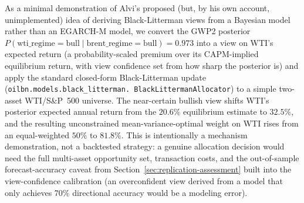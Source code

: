 As a minimal demonstration of Alvi's proposed (but, by his own account,
unimplemented) idea of deriving Black-Litterman views from a Bayesian
model rather than an EGARCH-M model, we convert the GWP2 posterior
$P(\text{wti\_regime}=\text{bull} \mid \text{brent\_regime}=\text{bull})
= 0.973$ into a view on WTI's expected return (a probability-scaled
premium over its CAPM-implied equilibrium return, with view confidence
set from how sharp the posterior is) and apply the standard
closed-form Black-Litterman update (\texttt{oilbn.models.black\_litterman.
BlackLittermanAllocator}) to a simple two-asset WTI/S\&P~500 universe.
The near-certain bullish view shifts WTI's posterior expected annual
return from the $20.6\%$ equilibrium estimate to $32.5\%$, and the
resulting unconstrained mean-variance-optimal weight on WTI rises from
an equal-weighted $50\%$ to $81.8\%$. This is intentionally a
mechanism demonstration, not a backtested strategy: a genuine allocation
decision would need the full multi-asset opportunity set, transaction
costs, and the out-of-sample forecast-accuracy caveat from
Section~\ref{sec:replication-assessment} built into the view-confidence
calibration (an overconfident view derived from a model that only
achieves 70\% directional accuracy would be a modeling error).
